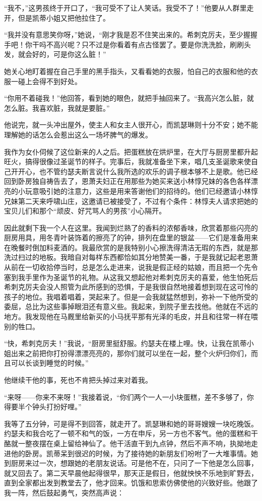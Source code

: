 \par “我不，”这男孩终于开口了，“我可受不了让人笑话。我受不了！”他要从人群里走开，但是凯蒂小姐又把他拉住了。
\par “我并没有意思笑你呀，”她说，“刚才我是忍不住笑出来的。希刺克厉夫，至少握握手吧！你干吗不高兴呢？只不过是你看着有点古怪罢了。要是你洗洗脸，刷刷头发，就会好的，可是你这么脏！”
\par 她关心地盯着握在自己手里的黑手指头，又看看她的衣服，怕自己的衣服和他的衣服一碰上会得不到好处。
\par “你用不着碰我！”他回答，看到她的眼色，就把手抽回来了。“我高兴怎么脏，就怎么脏。我喜欢脏，我就是要脏。”
\par 他说完，就一头冲出屋外，使主人和女主人很开心，而凯瑟琳则十分不安；她不能理解她的话怎么会惹出这么一场坏脾气的爆发。
\par 我作为女仆伺候了这位新来的人之后。把蛋糕放在烘炉里，在大厅与厨房里都升起旺火，搞得很像过圣诞节的样子。完事后，我就准备坐下来，唱几支圣诞歌来使自己开开心，也不管约瑟夫断言说什么我所选的欢乐的调子根本够不上是歌。他已经回到卧房独自祷告去了，恩萧夫妇正在用那些为她买来送小林惇兄妹的各色各样漂亮的小玩意吸引她的注意力，这些是用来答谢他们的招待的。他们已经邀请小林惇兄妹第二天来呼啸山庄，这邀请已被接受了，不过有个条件：林惇夫人请求把她的宝贝儿们和那个“顽皮、好咒骂人的男孩”小心隔开。
\par 因此就剩下我一个人在这里。我闻到烂熟了的香料的浓郁香味，欣赏着那些闪亮的厨房用具，用冬青叶装饰着的擦亮了的钟，排列在盘里的银盆——它们是准备用来在晚餐时倒加料麦酒的。我最欣赏的是我特别小心擦洗得清洁无瑕的东西，就是那洗过扫过的地板。我暗自对每样东西都恰如其分地赞美一番，于是我就记起老恩萧从前在一切收拾停当时，总是怎么走进来，说我是假正经的姑娘，而且把一个先令塞到我手里作为圣诞节的礼物。从这我又想起他对希刺克厉夫的喜爱，他生怕死后希刺克厉夫会没人照管为此所感到的恐惧，于是我很自然地接着想到现在这可怜的孩子的地位。我唱着唱着，哭起来了。但是一会我就猛然想到，弥补一下他所受的委屈，总比为这些事掉眼泪还有意义些。我起来，到院子里去找他。他就在不远的地方。我发现他在马厩里给新买的小马抚平那有光泽的毛皮，并且和往常一样在喂别的牲口。
\par “快，希刺克厉夫！”我说，“厨房里挺舒服。约瑟夫在楼上哩。快，让我在凯蒂小姐出来之前把你打扮得漂漂亮亮的，那你们就可以坐在一起，整个火炉归你们，而且可以长谈到睡觉的时候。”
\par 他继续干他的事，死也不肯把头掉过来对着我。
\par “来呀——你来不来呀！”我接着说，“你们两个一人一小块蛋糕，差不多够了，你得要半个钟头打扮好哩。”
\par 我等了五分钟，可是得不到回答，就走开了。凯瑟琳和她的哥哥嫂嫂一块吃晚饭。约瑟夫和我合吃了一顿不和气的饭，一方在申斥，另一方也不客气。他的蛋糕和干酪就一整夜摆在桌上留给神仙了。他干活直干到九点钟，然后不声不响，执拗地走进他的卧房。凯蒂呆到很迟的时候，为了接待她的新朋友们吩咐了一大堆事情。她到厨房来过一次，想跟她的老朋友说话。可是他不在，只问了一下他是怎么回事，就又回去了。第二天早晨他起得很早，那天正是假日，他就怏怏不乐地到旷野去，直到全家都出发到教堂去了，他才回来。饥饿和思索仿佛使他的兴致好些。他跟了我一阵，然后鼓起勇气，突然高声说：

